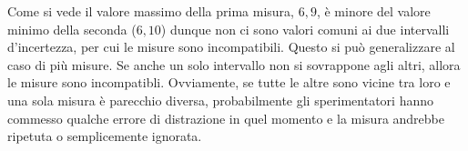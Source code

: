 Come si vede il valore massimo della prima misura, $6,9$, è minore del valore minimo della seconda ($6,10$) dunque non ci sono valori comuni ai due intervalli d'incertezza, per cui le misure sono incompatibili. Questo si può generalizzare al caso di più misure. Se anche un solo intervallo non si sovrappone agli altri, allora le misure sono incompatibli. Ovviamente, se tutte le altre sono vicine tra loro e una sola misura è parecchio diversa, probabilmente gli sperimentatori hanno commesso qualche errore di distrazione in quel momento e la misura andrebbe
 ripetuta o semplicemente ignorata.
 
 